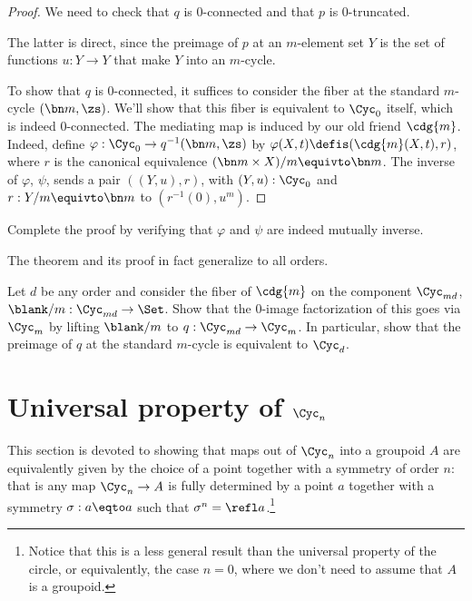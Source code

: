 \begin{proof}
  We need to check that $q$ is $0$-connected
  and that $p$ is $0$-truncated.

  The latter is direct, since the preimage of $p$ at an $m$-element set $Y$
  is the set of functions $u : Y \to Y$ that make $Y$ into an $m$-cycle.

  To show that $q$ is $0$-connected,
  it suffices to consider the fiber at the standard $m$-cycle $(\bn m,\zs)$.
  We'll show that this fiber is equivalent to $\Cyc_0$ itself, which is indeed $0$-connected.
  The mediating map is induced by our old friend $\cdg{m}$.
  Indeed, define $\varphi : \Cyc_0 \to q^{-1}(\bn m,\zs)$
  by $\varphi(X,t)\defis(\cdg{m}(X,t), r)$,
  where $r$ is the canonical equivalence $(\bn m\times X)/m \equivto \bn m$.
  The inverse of $\varphi$, $\psi$, sends a pair $((Y,u), r)$,
  with $(Y,u):\Cyc_0$ and $r : Y/m \equivto \bn m$
  to $(r^{-1}(0), u^m)$.
\end{proof}

\begin{xca}
  Complete the proof by verifying that $\varphi$ and $\psi$ are indeed mutually inverse.
\end{xca}

The theorem and its proof in fact generalize to all orders.

\begin{xca}\label{xca:image-Cmd-to-Cm}
  Let $d$ be any order and consider the fiber of $\cdg{m}$ on the component
  $\Cyc_{md}$, $\blank/m : \Cyc_{md} \to \Set$.
  Show that the $0$-image factorization of this goes via $\Cyc_m$ by
  lifting $\blank/m$ to $q : \Cyc_{md} \to \Cyc_m$.
  In particular, show that the preimage of $q$ at the standard $m$-cycle
  is equivalent to $\Cyc_d$.
\end{xca}

\section{Universal property of $\Cyc_n$}
\label{sec:universal-property-cyc-n}

This section is devoted to showing that maps out of $\Cyc_n$ into a groupoid $A$
are equivalently given by the choice of a point together with a symmetry of
order $n$: that is any map $\Cyc_n \to A$ is fully determined by a point $a$ together with a symmetry $\sigma:a\eqto a$ such that
$\sigma^n=\refl a$.\footnote{Notice that this is a less general result than the universal property of the circle, or equivalently, the case $n=0$, where we don't need to assume that $A$ is a groupoid.}


